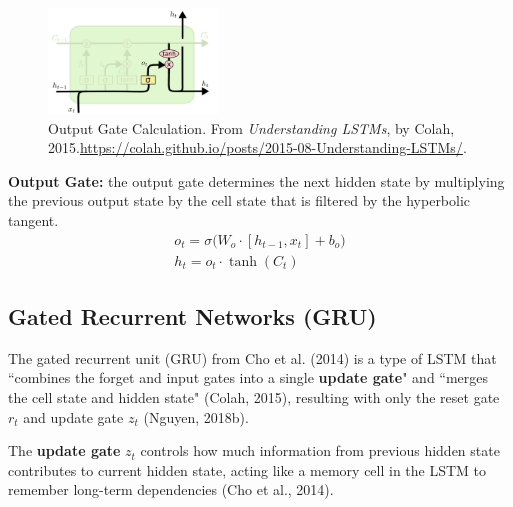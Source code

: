 \clearpage
\begin{program}
\begin{figure}
\vspace{-20pt}
\begin{center}
    \includegraphics[width=0.4\textwidth]{imgs/lstm_outputGate.png}    
\end{center}
\vspace{-20pt}
\caption{\footnotesize Output Gate Calculation. From \emph{Understanding LSTMs}, by Colah, 2015.\url{https://colah.github.io/posts/2015-08-Understanding-LSTMs/}. }
\vspace{-5pt}
\end{figure}

\textbf{Output Gate: }the output gate determines the next hidden state by multiplying the previous output state by the cell state that is filtered by the hyperbolic tangent.
$$
\begin{array}{ll}
o_t = \sigma \Big( W_o \cdot [h_{t-1}, x_t] + b_o \Big) \\
h_t = o_t \cdot \tanh(C_t)
\end{array}
$$ 
\newline\newline\newline\newline\newline
\end{program}



\subsection{Gated Recurrent Networks (GRU)}

The gated recurrent unit (GRU) from Cho et al. (2014) is a type of LSTM that ``combines the forget and input gates into a single \textbf{update gate}" and ``merges the cell state and hidden state" (Colah, 2015), resulting with only the reset gate $r_t$ and update gate $z_t$ (Nguyen, 2018b). 

The \textbf{update gate} $z_t$ controls how much information from previous hidden state contributes to current hidden state, acting like a memory cell in the LSTM to remember long-term dependencies (Cho et al., 2014). 

